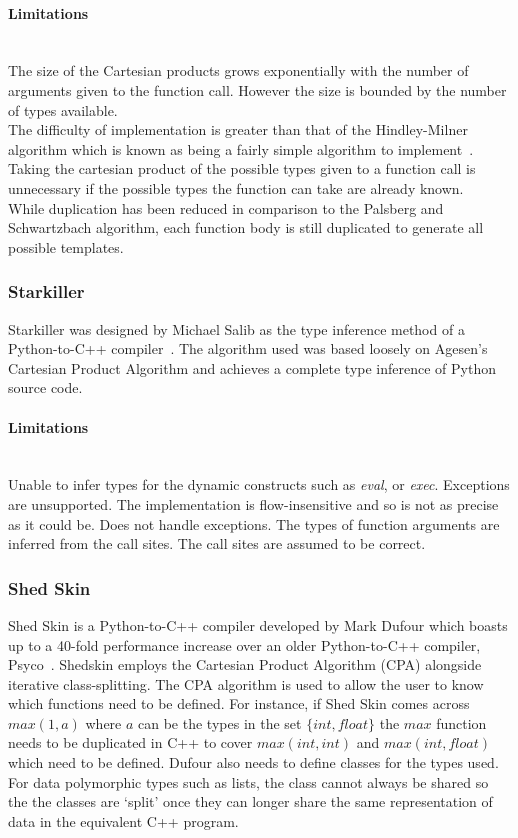 \documentclass[12pt, titlepage]{article}
\begin{document}
\paragraph*{Limitations}\mbox{}\\
The size of the Cartesian products grows exponentially with the number of arguments given to the function call. However the size is bounded by the number of types available. \\
The difficulty of implementation is greater than that of the Hindley-Milner algorithm which is known as being a fairly simple algorithm to implement~\cite{jones95}. \\
Taking the cartesian product of the possible types given to a function call is unnecessary if the possible types the function can take are already known. \\
While duplication has been reduced in comparison to the Palsberg and Schwartzbach algorithm, each function body is still duplicated to generate all possible templates.

\subsubsection{Starkiller}
Starkiller was designed by Michael Salib as the type inference method of a Python-to-C++ compiler~\cite{starkiller}. The algorithm used was based loosely on Agesen’s Cartesian Product Algorithm and achieves a complete type inference of Python source code.
\paragraph*{Limitations}\mbox{}\\
Unable to infer types for the dynamic constructs such as \textit{eval}, or \textit{exec}. Exceptions are unsupported. The implementation is flow-insensitive and so is not as precise as it could be. Does not handle exceptions. The types of function arguments are inferred from the call sites. The call sites are assumed to be correct.

\subsubsection{Shed Skin}
Shed Skin is a Python-to-C++ compiler developed by Mark Dufour which boasts up to a 40-fold performance increase over an older Python-to-C++ compiler, Psyco~\cite{shedskin}. Shedskin employs the Cartesian Product Algorithm (CPA) alongside iterative class-splitting. The CPA algorithm is used to allow the user to know which functions need to be defined. For instance, if Shed Skin comes across $max(1, a)$ where $a$ can be the types in the set $\{int, float\}$ the $max$ function needs to be duplicated in C++ to cover $max(int, int)$ and $max(int, float)$ which need to be defined. Dufour also needs to define classes for the types used. For data polymorphic types such as lists, the class cannot always be shared so the the classes are `split' once they can longer share the same representation of data in the equivalent C++ program.
\end{document}
